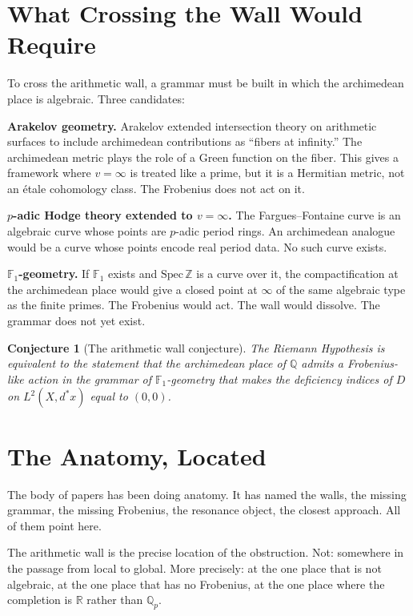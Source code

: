 \documentclass[12pt]{article}
\newtheorem{conjecture}[theorem]{Conjecture}
\theoremstyle{definition}
\theoremstyle{remark}
\begin{document}
\section{What Crossing the Wall Would Require}

To cross the arithmetic wall, a grammar must be built
in which the archimedean place is algebraic.
Three candidates:

\textbf{Arakelov geometry.}
Arakelov \cite{arakelov1974} extended intersection theory on arithmetic surfaces
to include archimedean contributions as ``fibers at infinity.''
The archimedean metric plays the role of a Green function on the fiber.
This gives a framework where $v = \infty$ is treated like a prime,
but it is a Hermitian metric, not an étale cohomology class.
The Frobenius does not act on it.

\textbf{$p$-adic Hodge theory extended to $v = \infty$.}
The Fargues--Fontaine curve \cite{fargues2021} is an algebraic curve
whose points are $p$-adic period rings.
An archimedean analogue would be a curve
whose points encode real period data.
No such curve exists.

\textbf{$\mathbb{F}_1$-geometry.}
If $\mathbb{F}_1$ exists and $\mathrm{Spec}\,\mathbb{Z}$ is a curve over it,
the compactification at the archimedean place
would give a closed point at $\infty$ of the same algebraic type as the finite primes.
The Frobenius would act.
The wall would dissolve.
The grammar does not yet exist.

\begin{conjecture}[The arithmetic wall conjecture]
The Riemann Hypothesis is equivalent to the statement
that the archimedean place of $\mathbb{Q}$ admits a Frobenius-like action
in the grammar of $\mathbb{F}_1$-geometry
that makes the deficiency indices of $D$ on $L^2(X, d^*x)$ equal to $(0,0)$.
\end{conjecture}

\section{The Anatomy, Located}

The body of papers has been doing anatomy.
It has named the walls, the missing grammar, the missing Frobenius,
the resonance object, the closest approach.
All of them point here.

The arithmetic wall is the precise location of the obstruction.
Not: somewhere in the passage from local to global.
More precisely: at the one place that is not algebraic,
at the one place that has no Frobenius,
at the one place where the completion is $\mathbb{R}$ rather than $\mathbb{Q}_p$.
\end{document}
